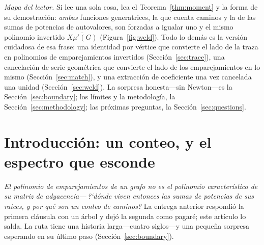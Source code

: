 \documentclass[11pt]{article}
\begin{document}
\noindent\emph{Mapa del lector.} Si lee una sola cosa, lea el Teorema~\ref{thm:moment} y la forma de
su demostraci\'on: \emph{ambas} funciones generatrices, la que cuenta caminos y la de las sumas de
potencias de autovalores, son forzadas a igualar uno y el mismo polinomio invertido
$\overline{X\mu'(G)}$ (Figura~\ref{fig:weld}). Todo lo dem\'as es la versi\'on cuidadosa de esa frase:
una identidad por v\'ertice que convierte el lado de la traza en polinomios de emparejamientos
invertidos (Secci\'on~\ref{sec:trace}), una cancelaci\'on de serie geom\'etrica que convierte el lado
de los emparejamientos en lo mismo (Secci\'on~\ref{sec:match}), y una extracci\'on de coeficiente una
vez cancelada una unidad (Secci\'on~\ref{sec:weld}). La sorpresa honesta---sin Newton---es la
Secci\'on~\ref{sec:boundary}; los l\'imites y la metodolog\'ia, la Secci\'on~\ref{sec:methodology};
las pr\'oximas preguntas, la Secci\'on~\ref{sec:questions}.

\section{Introducci\'on: un conteo, y el espectro que esconde}
\label{sec:intro}

\emph{El polinomio de emparejamientos de un grafo no es el polinomio caracter\'istico de su matriz de
adyacencia---\,?`d\'onde viven entonces las sumas de potencias de sus ra\'ices, y por qu\'e son un
conteo de caminos?} La entrega anterior respondi\'o la primera cl\'ausula con un \'arbol y dej\'o la segunda
como pagar\'e; este art\'iculo lo salda. La ruta tiene una historia larga---cuatro siglos---y una
peque\~na sorpresa esperando en su \'ultimo paso (Secci\'on~\ref{sec:boundary}).
\end{document}

